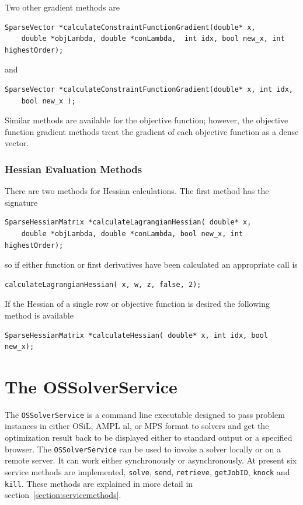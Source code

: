 \documentclass[11pt]{article}
\renewcommand{\_}{{\char"5F}}
\renewcommand{\{}{{\char"7B}}
\renewcommand{\}}{{\char"7D}}
\renewcommand{\^}{{\char"0D}}
\renewcommand{\'}{{\char"0D}}
\begin{document}
\begin{enumerate}[Step 1:]
Two other gradient methods are
\begin{verbatim}
SparseVector *calculateConstraintFunctionGradient(double* x,
    double *objLambda, double *conLambda,  int idx, bool new_x, int highestOrder);
\end{verbatim}
and
\begin{verbatim}
SparseVector *calculateConstraintFunctionGradient(double* x, int idx,
    bool new_x );
\end{verbatim}

Similar methods are available for the objective function; however, the objective function gradient methods treat the gradient of each objective function as a dense vector.


\subsubsection{Hessian Evaluation Methods}

There are two methods for Hessian calculations.  The first method has the signature
\begin{verbatim}
SparseHessianMatrix *calculateLagrangianHessian( double* x,
    double *objLambda, double *conLambda, bool new_x, int highestOrder);
\end{verbatim}
so if either function or first derivatives have been calculated an appropriate call is
\begin{verbatim}
calculateLagrangianHessian( x, w, z, false, 2);
\end{verbatim}
If the Hessian of a single row or objective function is desired the following method is available
\begin{verbatim}
SparseHessianMatrix *calculateHessian( double* x, int idx, bool new_x);
\end{verbatim}

\section{The OSSolverService}\label{section:ossolverservice}

The {\tt OSSolverService} is a command line executable designed
to pass problem instances in either  OSiL, AMPL nl, or MPS format
to solvers and get the optimization result back to be displayed either to standard output or a specified browser.
The {\tt OSSolverService} can be used to invoke a solver locally or on a remote server. It can work either synchronously
or asynchronously. At present six service methods are implemented, {\tt solve},
{\tt send}, {\tt retrieve},
{\tt getJobID}, {\tt knock} and {\tt kill}.
These methods are explained in more detail in section~\ref{section:servicemethods}.


\end{enumerate}
\end{document}
